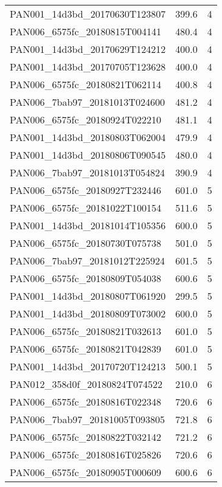 \begin{tabular}{lrr}
PAN001\_14d3bd\_20170630T123807 &      399.6 &        4 \\
PAN006\_6575fc\_20180815T004141 &      480.4 &        4 \\
PAN001\_14d3bd\_20170629T124212 &      400.0 &        4 \\
PAN001\_14d3bd\_20170705T123628 &      400.0 &        4 \\
PAN006\_6575fc\_20180821T062114 &      400.8 &        4 \\
PAN006\_7bab97\_20181013T024600 &      481.2 &        4 \\
PAN006\_6575fc\_20180924T022210 &      481.1 &        4 \\
PAN001\_14d3bd\_20180803T062004 &      479.9 &        4 \\
PAN001\_14d3bd\_20180806T090545 &      480.0 &        4 \\
PAN006\_7bab97\_20181013T054824 &      390.9 &        4 \\
PAN006\_6575fc\_20180927T232446 &      601.0 &        5 \\
PAN006\_6575fc\_20181022T100154 &      511.6 &        5 \\
PAN001\_14d3bd\_20181014T105356 &      600.0 &        5 \\
PAN006\_6575fc\_20180730T075738 &      501.0 &        5 \\
PAN006\_7bab97\_20181012T225924 &      601.5 &        5 \\
PAN006\_6575fc\_20180809T054038 &      600.6 &        5 \\
PAN001\_14d3bd\_20180807T061920 &      299.5 &        5 \\
PAN001\_14d3bd\_20180809T073002 &      600.0 &        5 \\
PAN006\_6575fc\_20180821T032613 &      601.0 &        5 \\
PAN006\_6575fc\_20180821T042839 &      601.0 &        5 \\
PAN001\_14d3bd\_20170720T124213 &      500.1 &        5 \\
PAN012\_358d0f\_20180824T074522 &      210.0 &        6 \\
PAN006\_6575fc\_20180816T022348 &      720.6 &        6 \\
PAN006\_7bab97\_20181005T093805 &      721.8 &        6 \\
PAN006\_6575fc\_20180822T032142 &      721.2 &        6 \\
PAN006\_6575fc\_20180816T025826 &      720.6 &        6 \\
PAN006\_6575fc\_20180905T000609 &      600.6 &        6 \\

\end{tabular}
